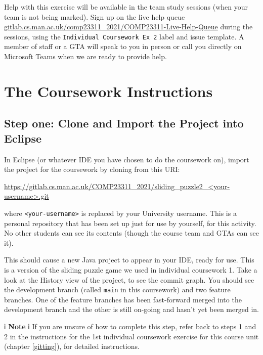 \documentclass[
]{book}
\begin{document}
Help with this exercise will be available in the team study sessions (when your team is not being marked). Sign up on the live help queue \href{https://gitlab.cs.man.ac.uk/comp23311_2021/COMP23311-Live-Help-Queue/}{gitlab.cs.man.ac.uk/comp23311\_2021/COMP23311-Live-Help-Queue} during the sessions, using the \texttt{Individual\ Coursework\ Ex\ 2} label and issue template. A member of staff or a GTA will speak to you in person or call you directly on Microsoft Teams when we are ready to provide help.

\hypertarget{indycwk2in}{%
\section{The Coursework Instructions}\label{indycwk2in}}

\hypertarget{cloneandimport}{%
\subsection{Step one: Clone and Import the Project into Eclipse}\label{cloneandimport}}

In Eclipse (or whatever IDE you have chosen to do the coursework on), import the project for the coursework by cloning from this URI:

\href{https://gitlab.cs.man.ac.uk/COMP23311_2021/sliding_puzzle2-your-username.git}{https://gitlab.cs.man.ac.uk/COMP23311\_2021/sliding\_puzzle2\_\textless your-username\textgreater.git}

where \texttt{\textless{}your-username\textgreater{}} is replaced by your University username. This is a personal repository that has been set up just for use by yourself, for this activity. No other students can see its contents (though the course team and GTAs can see it).

This should cause a new Java project to appear in your IDE, ready for use. This is a version of the sliding puzzle game we used in individual coursework 1. Take a look at the History view of the project, to see the commit graph. You should see the development branch (called \texttt{main} in this coursework) and two feature branches. One of the feature branches has been fast-forward merged into the development branch and the other is still on-going and hasn't yet been merged in.

ℹ️ \textbf{Note} ℹ️
If you are unsure of how to complete this step, refer back to steps 1 and 2 in the instructions for the 1st individual coursework exercise for this course unit (chapter \ref{gitting}), for detailed instructions.
\end{document}
